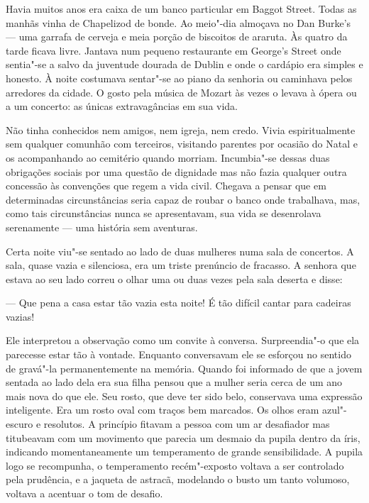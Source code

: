 Havia muitos anos era caixa de um banco particular em Baggot Street.  Todas as
manhãs vinha de Chapelizod de bonde.  Ao meio"-dia almoçava no Dan Burke’s
--- uma garrafa de cerveja e meia porção de biscoitos de araruta.  Às quatro
da tarde ficava livre.  Jantava num pequeno restaurante em George’s Street onde
sentia"-se a salvo da juventude dourada de Dublin e onde o cardápio era simples
e honesto.  À noite costumava sentar"-se ao piano da senhoria ou caminhava pelos
arredores da cidade.  O gosto pela música de Mozart às vezes o levava à ópera
ou a um concerto: as únicas extravagâncias em sua vida.

Não tinha conhecidos nem amigos, nem igreja, nem credo.  Vivia espiritualmente
sem qualquer comunhão com terceiros, visitando parentes por ocasião do Natal e
os acompanhando ao cemitério quando morriam.  Incumbia"-se dessas duas
obrigações sociais por uma questão de dignidade mas não fazia qualquer outra
concessão às convenções que regem a vida civil.  Chegava a pensar que em
determinadas circunstâncias seria capaz de roubar o banco onde trabalhava, mas,
como tais circunstâncias nunca se apresentavam, sua vida se desenrolava
serenamente --- uma história sem aventuras.

Certa noite viu"-se sentado ao lado de duas mulheres numa sala de concertos.  A
sala, quase vazia e silenciosa, era um triste prenúncio de fracasso.  A senhora
que estava ao seu lado correu o olhar uma ou duas vezes pela sala deserta e
disse:

--- Que pena a casa estar tão vazia esta noite!  É tão difícil cantar para
cadeiras vazias!

Ele interpretou a observação como um convite à conversa.  Surpreendia"-o que ela
parecesse estar tão à vontade.  Enquanto conversavam ele se esforçou no sentido
de gravá"-la permanentemente na memória.  Quando foi informado de que a jovem
sentada ao lado dela era sua filha pensou que a mulher seria cerca de um ano
mais nova do que ele.  Seu rosto, que deve ter sido belo, conservava uma
expressão inteligente.  Era um rosto oval com traços bem marcados.  Os olhos
eram azul"-escuro e resolutos.  A princípio fitavam a pessoa com um ar
desafiador mas titubeavam com um movimento que parecia um desmaio da pupila
dentro da íris, indicando momentaneamente um temperamento de grande
sensibilidade.  A pupila logo se recompunha, o temperamento recém"-exposto
voltava a ser controlado pela prudência, e a jaqueta de astracã, modelando o
busto um tanto volumoso, voltava a acentuar o tom de desafio.

